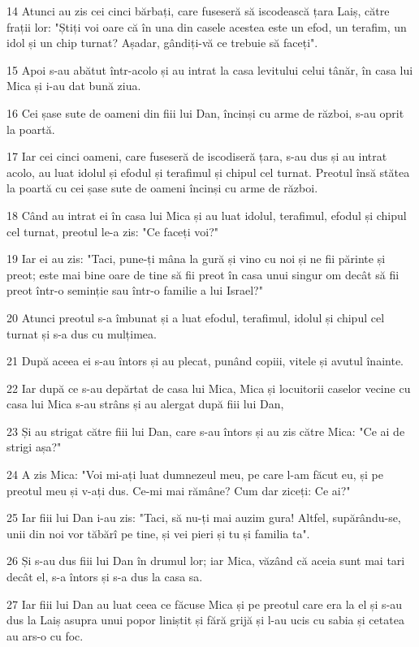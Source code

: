\par 14 Atunci au zis cei cinci bărbați, care fuseseră să iscodească țara Laiș, către frații lor: "Știți voi oare că în una din casele acestea este un efod, un terafim, un idol și un chip turnat? Așadar, gândiți-vă ce trebuie să faceți".
\par 15 Apoi s-au abătut într-acolo și au intrat la casa levitului celui tânăr, în casa lui Mica și i-au dat bună ziua.
\par 16 Cei șase sute de oameni din fiii lui Dan, încinși cu arme de război, s-au oprit la poartă.
\par 17 Iar cei cinci oameni, care fuseseră de iscodiseră țara, s-au dus și au intrat acolo, au luat idolul și efodul și terafimul și chipul cel turnat. Preotul însă stătea la poartă cu cei șase sute de oameni încinși cu arme de război.
\par 18 Când au intrat ei în casa lui Mica și au luat idolul, terafimul, efodul și chipul cel turnat, preotul le-a zis: "Ce faceți voi?"
\par 19 Iar ei au zis: "Taci, pune-ți mâna la gură și vino cu noi și ne fii părinte și preot; este mai bine oare de tine să fii preot în casa unui singur om decât să fii preot într-o seminție sau într-o familie a lui Israel?"
\par 20 Atunci preotul s-a îmbunat și a luat efodul, terafimul, idolul și chipul cel turnat și s-a dus cu mulțimea.
\par 21 După aceea ei s-au întors și au plecat, punând copiii, vitele și avutul înainte.
\par 22 Iar după ce s-au depărtat de casa lui Mica, Mica și locuitorii caselor vecine cu casa lui Mica s-au strâns și au alergat după fiii lui Dan,
\par 23 Și au strigat către fiii lui Dan, care s-au întors și au zis către Mica: "Ce ai de strigi așa?"
\par 24 A zis Mica: "Voi mi-ați luat dumnezeul meu, pe care l-am făcut eu, și pe preotul meu și v-ați dus. Ce-mi mai rămâne? Cum dar ziceți: Ce ai?"
\par 25 Iar fiii lui Dan i-au zis: "Taci, să nu-ți mai auzim gura! Altfel, supărându-se, unii din noi vor tăbărî pe tine, și vei pieri și tu și familia ta".
\par 26 Și s-au dus fiii lui Dan în drumul lor; iar Mica, văzând că aceia sunt mai tari decât el, s-a întors și s-a dus la casa sa.
\par 27 Iar fiii lui Dan au luat ceea ce făcuse Mica și pe preotul care era la el și s-au dus la Laiș asupra unui popor liniștit și fără grijă și l-au ucis cu sabia și cetatea au ars-o cu foc.
